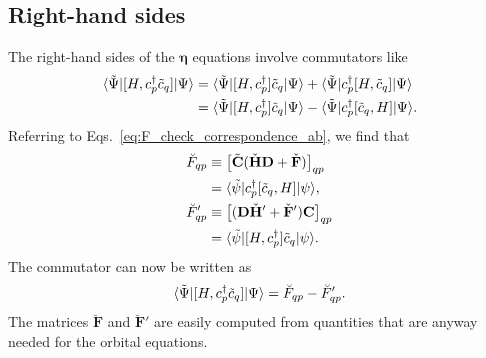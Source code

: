 \documentclass[aip,jcp,preprint,superscriptaddress,nofootinbib]{revtex4-1}
\begin{document}
\subsection{Right-hand sides}

The right-hand sides of the $\bm{\eta}$ equations
involve commutators like 
\begin{align}
       \langle \tilde{\Psi} \vert  [H, c^{\dagger}_{p} \tilde{c}_{q}]    \vert  \Psi  \rangle
    &= \langle \tilde{\Psi} \vert  [H, c^{\dagger}_{p} ] \tilde{c}_{q}   \vert  \Psi  \rangle
    +  \langle \tilde{\Psi} \vert  c^{\dagger}_{p} [H,  \tilde{c}_{q} ]  \vert  \Psi  \rangle \nonumber\\
    &= \langle \tilde{\Psi} \vert  [H, c^{\dagger}_{p} ] \tilde{c}_{q}   \vert  \Psi  \rangle
    -  \langle \tilde{\Psi} \vert  c^{\dagger}_{p} [\tilde{c}_{q}, H ]   \vert  \Psi  \rangle.
\end{align}
Referring to Eqs.~\eqref{eq:F_check_correspondence_ab}, we find that
\begin{subequations}
    \begin{align}
        \breve{F}_{qp} 
        &\equiv \big[ \tilde{\mathbf{C}} (\check{\mathbf{H}} \mathbf{D} + \check{\mathbf{F}}) \big]_{q p} \nonumber\\
        &= \langle \tilde{\psi} \vert  c^{\dagger}_{p} [\tilde{c}_{q}, H]  \vert \psi \rangle,  \\
        \breve{F}'_{qp} 
        &\equiv\big[ (\mathbf{D} \check{\mathbf{H}}' + \check{\mathbf{F}}' ) \mathbf{C} \big]_{q p} \nonumber\\
        &= \langle \tilde{\psi} \vert  [H, c^{\dagger}_{p}] \tilde{c}_{q}   \vert \psi \rangle.
    \end{align}
\end{subequations}
The commutator can now be written as
\begin{align}
    \langle \tilde{\Psi} \vert  [H, c^{\dagger}_{p} \tilde{c}_{q}]  \vert  \Psi  \rangle = \breve{F}_{qp} - \breve{F}'_{qp}.
\end{align}
The matrices $\breve{\mathbf{F}}$ and $\breve{\mathbf{F}}'$ are
easily computed from quantities that are anyway needed for the
orbital equations.
\end{document}
